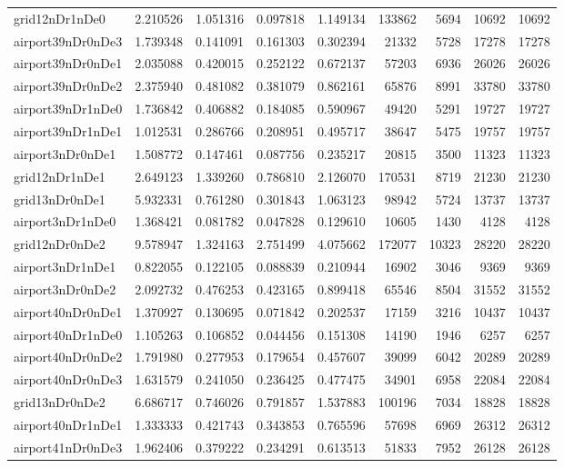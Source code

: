 \documentclass[../../../thesis.tex]{subfiles}
\begin{document}
\begin{longtable}{|l|r|r|r|r|r|r|r|r|}
grid12nDr1nDe0 & 2.210526 & 1.051316 & 0.097818 & 1.149134 & 133862 & 5694 & 10692 & 10692 \\
airport39nDr0nDe3 & 1.739348 & 0.141091 & 0.161303 & 0.302394 & 21332 & 5728 & 17278 & 17278 \\
airport39nDr0nDe1 & 2.035088 & 0.420015 & 0.252122 & 0.672137 & 57203 & 6936 & 26026 & 26026 \\
airport39nDr0nDe2 & 2.375940 & 0.481082 & 0.381079 & 0.862161 & 65876 & 8991 & 33780 & 33780 \\
airport39nDr1nDe0 & 1.736842 & 0.406882 & 0.184085 & 0.590967 & 49420 & 5291 & 19727 & 19727 \\
airport39nDr1nDe1 & 1.012531 & 0.286766 & 0.208951 & 0.495717 & 38647 & 5475 & 19757 & 19757 \\
airport3nDr0nDe1 & 1.508772 & 0.147461 & 0.087756 & 0.235217 & 20815 & 3500 & 11323 & 11323 \\
grid12nDr1nDe1 & 2.649123 & 1.339260 & 0.786810 & 2.126070 & 170531 & 8719 & 21230 & 21230 \\
grid13nDr0nDe1 & 5.932331 & 0.761280 & 0.301843 & 1.063123 & 98942 & 5724 & 13737 & 13737 \\
airport3nDr1nDe0 & 1.368421 & 0.081782 & 0.047828 & 0.129610 & 10605 & 1430 & 4128 & 4128 \\
grid12nDr0nDe2 & 9.578947 & 1.324163 & 2.751499 & 4.075662 & 172077 & 10323 & 28220 & 28220 \\
airport3nDr1nDe1 & 0.822055 & 0.122105 & 0.088839 & 0.210944 & 16902 & 3046 & 9369 & 9369 \\
airport3nDr0nDe2 & 2.092732 & 0.476253 & 0.423165 & 0.899418 & 65546 & 8504 & 31552 & 31552 \\
airport40nDr0nDe1 & 1.370927 & 0.130695 & 0.071842 & 0.202537 & 17159 & 3216 & 10437 & 10437 \\
airport40nDr1nDe0 & 1.105263 & 0.106852 & 0.044456 & 0.151308 & 14190 & 1946 & 6257 & 6257 \\
airport40nDr0nDe2 & 1.791980 & 0.277953 & 0.179654 & 0.457607 & 39099 & 6042 & 20289 & 20289 \\
airport40nDr0nDe3 & 1.631579 & 0.241050 & 0.236425 & 0.477475 & 34901 & 6958 & 22084 & 22084 \\
grid13nDr0nDe2 & 6.686717 & 0.746026 & 0.791857 & 1.537883 & 100196 & 7034 & 18828 & 18828 \\
airport40nDr1nDe1 & 1.333333 & 0.421743 & 0.343853 & 0.765596 & 57698 & 6969 & 26312 & 26312 \\
airport41nDr0nDe3 & 1.962406 & 0.379222 & 0.234291 & 0.613513 & 51833 & 7952 & 26128 & 26128 \\

\end{longtable}
\end{document}
